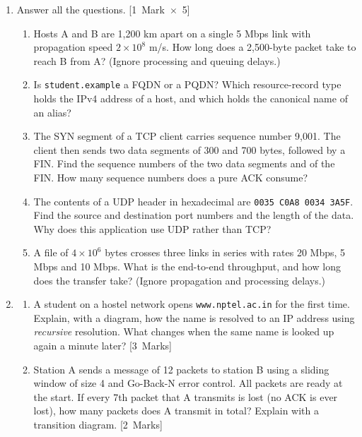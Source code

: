 \medskip
\begin{enumerate}[label=\textbf{\arabic*.},leftmargin=7mm,itemsep=6pt]
\item Answer all the questions. \hfill\mbox{[1 Mark $\times$ 5]}
\begin{enumerate}[label=\alph*),leftmargin=6mm,itemsep=2pt]
\item Hosts A and B are 1,200 km apart on a single 5 Mbps link with propagation speed $2\times10^{8}$ m/s. How long does a 2,500-byte packet take to reach B from A? (Ignore processing and queuing delays.)
\item Is \texttt{student.example} a FQDN or a PQDN? Which resource-record type holds the IPv4 address of a host, and which holds the canonical name of an alias?
\item The SYN segment of a TCP client carries sequence number 9,001. The client then sends two data segments of 300 and 700 bytes, followed by a FIN. Find the sequence numbers of the two data segments and of the FIN. How many sequence numbers does a pure ACK consume?
\item The contents of a UDP header in hexadecimal are \texttt{0035 C0A8 0034 3A5F}. Find the source and destination port numbers and the length of the data. Why does this application use UDP rather than TCP?
\item A file of $4\times10^{6}$ bytes crosses three links in series with rates 20 Mbps, 5 Mbps and 10 Mbps. What is the end-to-end throughput, and how long does the transfer take? (Ignore propagation and processing delays.)
\end{enumerate}

\item \begin{enumerate}[label=(\alph*),leftmargin=6mm,itemsep=2pt]
\item A student on a hostel network opens \texttt{www.nptel.ac.in} for the first time. Explain, with a diagram, how the name is resolved to an IP address using \emph{recursive} resolution. What changes when the same name is looked up again a minute later? \hfill\mbox{[3 Marks]}
\item Station A sends a message of 12 packets to station B using a sliding window of size 4 and Go-Back-N error control. All packets are ready at the start. If every 7th packet that A transmits is lost (no ACK is ever lost), how many packets does A transmit in total? Explain with a transition diagram. \hfill\mbox{[2 Marks]}
\end{enumerate}


\end{enumerate}
